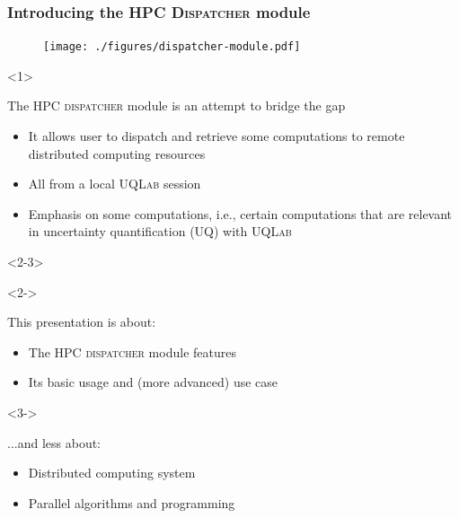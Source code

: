 \documentclass[]{rsuqbeamernew}
\begin{document}
\begin{frame}
\frametitle{Introducing the HPC \textsc{Dispatcher} module}

\begin{figure}[htbp]
  \texttt{[image: ./figures/dispatcher-module.pdf]}
\end{figure}    

\begin{onlyenv}<1>
\begin{block}{The HPC \textsc{dispatcher} module is an attempt to bridge the gap}
  \begin{itemize}
    \item It allows user to dispatch and retrieve {\altx some computations}
          to remote distributed computing resources
    \item All from a local \textsc{UQLab} session
    \item Emphasis on {\altx some computations}, i.e.,
          certain computations that are relevant in uncertainty quantification (UQ)
          with \textsc{UQLab}
  \end{itemize}
\end{block}
\end{onlyenv}

\begin{onlyenv}<2-3>
  \begin{onslide}<2->
  \begin{block}{This presentation is about:}
    \begin{itemize}
      \item The HPC \textsc{dispatcher} module features
      \item Its basic usage and (more advanced) use case
    \end{itemize}
  \end{block}
\end{onslide}

\begin{onslide}<3->
  \begin{block}{...and less about:}
    \begin{itemize}
      \item Distributed computing system
      \item Parallel algorithms and programming
    \end{itemize}
  \end{block}
\end{onslide}
\end{onlyenv}

\end{frame}
\end{document}

